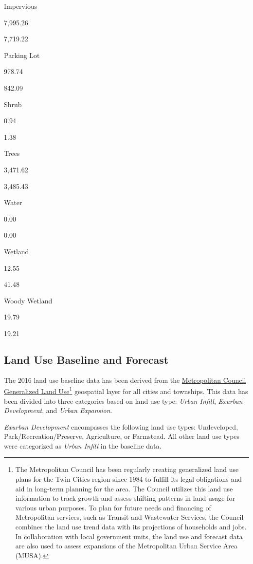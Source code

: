 \documentclass[
]{book}
\begin{document}
Impervious

7,995.26

7,719.22

Parking Lot

978.74

842.09

Shrub

0.94

1.38

Trees

3,471.62

3,485.43

Water

0.00

0.00

Wetland

12.55

41.48

Woody Wetland

19.79

19.21

\hypertarget{land-use-baseline-and-forecast}{%
\subsection{Land Use Baseline and Forecast}\label{land-use-baseline-and-forecast}}

The 2016 land use baseline data has been derived from the \href{https://metrocouncil.org/Data-and-Maps/Research-and-Data/Metadata/Landuse-Hist-Research.aspx}{Metropolitan Council Generalized Land Use}\footnote{The Metropolitan Council has been regularly creating generalized land use plans for the Twin Cities region since 1984 to fulfill its legal obligations and aid in long-term planning for the area. The Council utilizes this land use information to track growth and assess shifting patterns in land usage for various urban purposes. To plan for future needs and financing of Metropolitan services, such as Transit and Wastewater Services, the Council combines the land use trend data with its projections of households and jobs. In collaboration with local government units, the land use and forecast data are also used to assess expansions of the Metropolitan Urban Service Area (MUSA).} geospatial layer for all cities and townships. This data has been divided into three categories based on land use type: \emph{Urban Infill}, \emph{Exurban Development}, and \emph{Urban Expansion}.

\emph{Exurban Development} encompasses the following land use types: Undeveloped, Park/Recreation/Preserve, Agriculture, or Farmstead. All other land use types were categorized as \emph{Urban Infill} in the baseline data.
\end{document}
